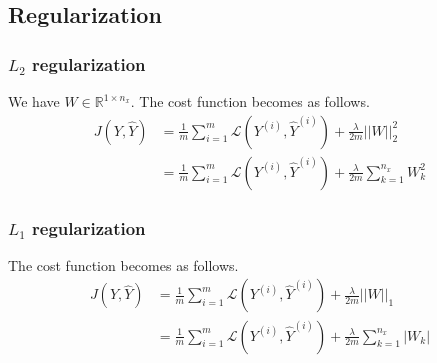 \subsection{Regularization}
\subsubsection{$L_2$ regularization}
We have $W\in\mathbb{R}^{1\times n_x}$.
The cost function becomes as follows.
\begin{align}
	J(Y, \hat{Y})
		&= \frac{1}{m} \sum_{i=1}^{m} \mathcal{L}(Y^{(i)},\hat{Y}^{(i)}) + \frac{\lambda}{2m} || W ||_2^2 \\
		&= \frac{1}{m} \sum_{i=1}^{m} \mathcal{L}(Y^{(i)},\hat{Y}^{(i)}) + \frac{\lambda}{2m} \sum_{k=1}^{n_x} W_k^2
\end{align}

\subsubsection{$L_1$ regularization}
The cost function becomes as follows.
\begin{align}
	J(Y, \hat{Y})
		&= \frac{1}{m} \sum_{i=1}^{m} \mathcal{L}(Y^{(i)},\hat{Y}^{(i)})  + \frac{\lambda}{2m} || W ||_1 \\
		&= \frac{1}{m} \sum_{i=1}^{m} \mathcal{L}(Y^{(i)},\hat{Y}^{(i)})  + \frac{\lambda}{2m} \sum_{k=1}^{n_x} | W_k |
\end{align}
